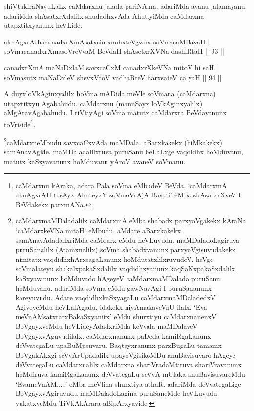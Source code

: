 \begin{artha}
shiVtakiraNavuLaLx caMdarxnu jalada pariNAma. adariMda avanu 
jalamayanu. adariMda shAsatxrXdalilx shudadhxvAda AhutiyiMda caMdarxna 
utapxtitxyanunx heVLide.
\end{artha}


\begin{shl}
aknAgxrAshacxnadxrXmAsatxsimxnuhxteV\s gwnx soVmasaMBavaH | \\
soVmacanadxrXmasoVreVvaM BeVdaH shAsetxrXVNa dashiRtaH \hfill|| 93 || 
\end{shl}

\begin{shl}
canadxrXmA maNaDxlaM savxcaCxM canadxrXkeVNa mitoV hi saH | \\
soVmasutx maNaDxleV shevxVtoV vadhaRteV harxsateV ca yaH \hfill|| 94 || 
\end{shl}

\begin{artha}
A duyxloVkAginxyalilx hoVma mADida meVle soVmana (caMdarxna) 
utapxtitxyu Agabahudu. caMdarxnu (manuSayx loVkAginxyalilx) 
aMgAravAgabahudu. I riVtiyAgi soVma matutx caMdarxra BeVdavanunx 
toVriside\footnote[2]{caMdarxnu kAraka, adara Pala soVma eMbudeV BeVda, 
`caMdarxmA aknAgxrAH tasAyx AhuteyxY soVmoVrAjA Bavati' eMba shAsatxrXveV I BeVdakekx parxmANa.}.
\end{artha}

\begin{artha}
\footnote[3]{caMdarxmaMDaladalilx caMdarxmA eMba shabadx parxyoVgakekx kAraNa `caMdarxkeVNa mitaH' eMbudu. aMdare aBarxkakekx samAnavAdadadxriMda caMdarx eMdu heVLuvudu. maMDaladoLagiruva puruSanalilx (Atamxnalilx) soVma shabadxvanunx parxyoVgisuvudakekx nimitatx vaqdidhxhArxsagaLanunx hoMdutatxlilxruvudeV. heVge soVmalateyu shukalxpakaSxdalilx vaqdidhxyanunx kaqSaNxpakaSxdalilx kaSxyavanunx hoMduvado hAgeyeV caMdarxmaMDalada puruSanu hoMduvanu. adariMda soVma eMdu gawNavAgi I puruSananunx kareyuvudu. Adare vaqdidhxkaSxyagaLu caMdarxmaMDaladedxV AgiveyeMdu heVLalAgadu. idakekx niyAmakaveVnU ilalx. `Eva meVnAMsatxtarxBakaSxyanitx' eMdu shurxtiyu caMdarxnanenxV BoVgayxveMdu heVLideyAdadxriMda keVvala maMDalaveV BoVgayxvAguvudilalx. caMdarxnanunx paDeda kamiRgaLanunx deVvategaLu upaBuMjisuvaru. Baqtayxranunx parxBugaLu tamamx BoVgakAkxgi seVvArUpadalilx upayoVgisikoMDu anuBavisuvaro hAgeye deVvategaLu caMdarxnalilx caMdarxna shariVradaMtiruva shariVravanunx hoMdiruva kamiRgaLanunx deVvategaLu seVvA mUlaka anuBavisuvareMdu `EvameVnAM.....' eMba meVlina shurxtiya athaR. adariMda deVvategaLige BoVgayxvAgiruvudu maMDaladoLagina puruSaneMde heVLuvudu yukatxveMdu TiVkAkArara aBipArxyavide.}caMdarxneMbudu savxcaCxvAda maMDala. aBarxkakekx (biMkakekx) samAnavAgide. maMDaladalilxruva puruSanu beLaLxge vaqdidhx hoMduvanu, matutx kaSxyavanunx hoMduvanu yAroV avaneV soVmanu.
\end{artha}

